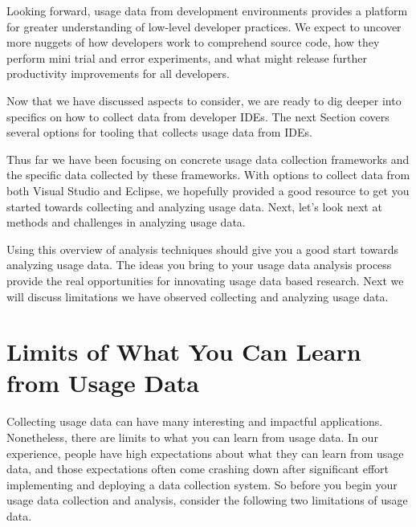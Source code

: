 \documentclass[authoryear]{elsarticle}
\begin{document}
Looking forward, usage data from development environments provides a platform for greater understanding of low-level developer practices.  We expect to uncover more nuggets of how developers work to comprehend source code, how they perform mini trial and error experiments, and what might release further productivity improvements for all developers.


\pagebreak






Now that we have discussed aspects to consider, we are ready to dig deeper into specifics on how to collect data from developer IDEs.  The next Section covers several options for tooling that collects usage data from IDEs.






Thus far we have been focusing on concrete usage data collection frameworks and the specific data collected by these frameworks.  With options to collect data from both Visual Studio and Eclipse, we hopefully provided a good resource to get you started towards collecting and analyzing usage data.  Next, let's look next at methods and challenges in analyzing usage data.

\newpage




Using this overview of analysis techniques should give you a good start towards analyzing usage data.
The ideas you bring to your usage data analysis process provide the real opportunities for innovating usage data based research.  Next we will discuss limitations we have observed collecting and analyzing usage data.

\section{Limits of What You Can Learn from Usage Data}
\label{sec:limitations}

Collecting usage data can have many interesting and impactful applications.
Nonetheless, there are limits to what you can learn
from usage data.
In our experience, people have
high expectations about what they can learn from usage data, and those
expectations often come crashing down after significant effort implementing
and deploying a data collection system.
So before you begin your usage data collection and analysis, consider
the following two limitations of usage data.
\end{document}
